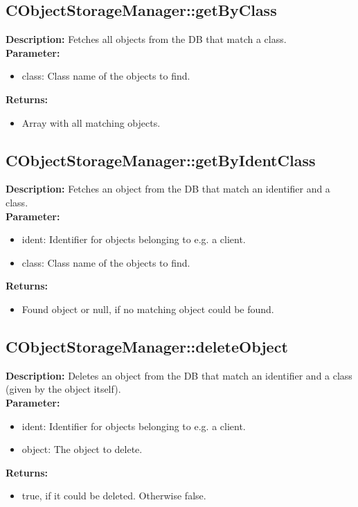\subsection{CObjectStorageManager::getByClass}
\textbf{Description:} Fetches all objects from the DB that match a class.\\
\textbf{Parameter:}
\begin{itemize}
\item class: Class name of the objects to find.
\end{itemize}
\textbf{Returns:}
\begin{itemize}
\item Array with all matching objects.
\end{itemize}

\subsection{CObjectStorageManager::getByIdentClass}
\textbf{Description:} Fetches an object from the DB that match an identifier and a class.\\
\textbf{Parameter:}
\begin{itemize}
\item ident: Identifier for objects belonging to e.g. a client.
\item class: Class name of the objects to find.
\end{itemize}
\textbf{Returns:}
\begin{itemize}
\item Found object or null, if no matching object could be found.
\end{itemize}

\subsection{CObjectStorageManager::deleteObject}
\textbf{Description:} Deletes an object from the DB that match an identifier and a class (given by the object itself).\\
\textbf{Parameter:}
\begin{itemize}
\item ident: Identifier for objects belonging to e.g. a client.
\item object: The object to delete.
\end{itemize}
\textbf{Returns:}
\begin{itemize}
\item true, if it could be deleted. Otherwise false.
\end{itemize}


